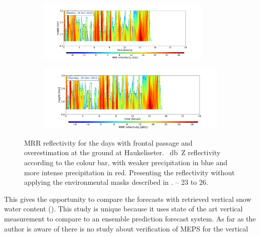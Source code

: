 \begin{figure}[H]
\begin{subfigure}[t]{\textwidth}
		\caption{}\label{fig:ret:refl25}
	\end{subfigure}
	\begin{subfigure}[t]{\textwidth}
		\centering
		\includegraphics[trim={4.cm 2.5cm 4.5cm 1.5cm},clip,width=0.91\textwidth]{./fig_MRR_refl/MRR_20161226}
		\caption{}\label{fig:ret:refl26}
	\end{subfigure}
	\begin{subfigure}[t]{\textwidth}
		\includegraphics[trim={6.5cm 0cm 5.3cm 15.5cm},clip,width=\textwidth]{./fig_MRR_refl/MRR_20161226}
	\end{subfigure}
	\caption{MRR reflectivity for the days with frontal passage and overestimation at the ground at Haukeliseter. \SI{}{\decibel Z} reflectivity according to the colour bar, with weaker precipitation in blue and more intense precipitation in red. Presenting the reflectivity without applying the environmental masks described in . \protect{}--\protect{} \num{23} to \SI{26}{\dec}.}\label{fig:ret:refl}
\end{figure}
\noindent
This %
gives the opportunity to compare the forecasts %
with retrieved vertical snow water content ().
This study is unique because it uses state of the art vertical measurement to compare to an ensemble prediction forecast system. As far as the author is aware of there is no study about verification of MEPS for the vertical %
